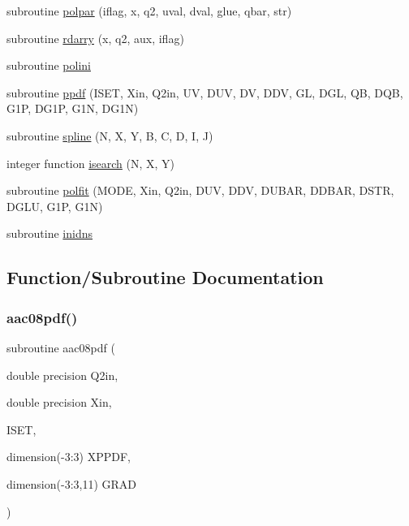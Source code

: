 \begin{DoxyCompactItemize}
\item 
subroutine \hyperlink{polpdf_8f_a3e3afd88ba8363455b22fd4fb5727df6}{polpar} (iflag, x, q2, uval, dval, glue, qbar, str)
\item 
subroutine \hyperlink{polpdf_8f_aa6768afb7e596138ae832b1324adb155}{rdarry} (x, q2, aux, iflag)
\item 
subroutine \hyperlink{polpdf_8f_ad28ff77cf4e713fdb1d299d0a95a3fd3}{polini}
\item 
subroutine \hyperlink{polpdf_8f_a2fb724c2930167235703c922c529999c}{ppdf} (I\+S\+ET, Xin, Q2in, UV, D\+UV, DV, D\+DV, GL, D\+GL, QB, D\+QB, G1P, D\+G1P, G1N, D\+G1N)
\item 
subroutine \hyperlink{polpdf_8f_a45eb8bcc97d5f2c125774ad51b11de67}{spline} (N, X, Y, B, C, D, I, J)
\item 
integer function \hyperlink{polpdf_8f_a0120bfb26b8b3f5c47eea5ad05daddcb}{isearch} (N, X, Y)
\item 
subroutine \hyperlink{polpdf_8f_a24e333d1b3a2fb23b03ecbc8498bbc29}{polfit} (M\+O\+DE, Xin, Q2in, D\+UV, D\+DV, D\+U\+B\+AR, D\+D\+B\+AR, D\+S\+TR, D\+G\+LU, G1P, G1N)
\item 
subroutine \hyperlink{polpdf_8f_a9195a0db206c1f7311e8a0b5d6bf4e66}{inidns}
\end{DoxyCompactItemize}


\subsection{Function/\+Subroutine Documentation}
\mbox{\label{polpdf_8f_abe9f73d8c98e5c5d6f644094fbc6625e}} 
\subsubsection{\texorpdfstring{aac08pdf()}{aac08pdf()}}
{\footnotesize\ttfamily subroutine aac08pdf (\begin{DoxyParamCaption}\item[{double precision}]{Q2in,  }\item[{double precision}]{Xin,  }\item[{}]{I\+S\+ET,  }\item[{dimension(-\/3\+:3)}]{X\+P\+P\+DF,  }\item[{dimension(-\/3\+:3,11)}]{G\+R\+AD }\end{DoxyParamCaption})}

